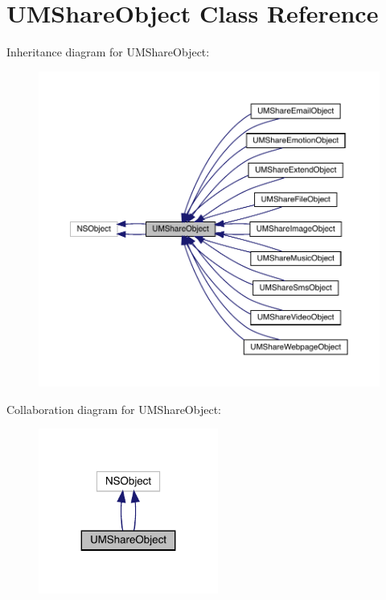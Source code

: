 \hypertarget{interface_u_m_share_object}{}\section{U\+M\+Share\+Object Class Reference}
\label{interface_u_m_share_object}


Inheritance diagram for U\+M\+Share\+Object\+:\nopagebreak
\begin{figure}[H]
\begin{center}
\leavevmode
\includegraphics[width=350pt]{interface_u_m_share_object__inherit__graph}
\end{center}
\end{figure}


Collaboration diagram for U\+M\+Share\+Object\+:\nopagebreak
\begin{figure}[H]
\begin{center}
\leavevmode
\includegraphics[width=167pt]{interface_u_m_share_object__coll__graph}
\end{center}
\end{figure}
